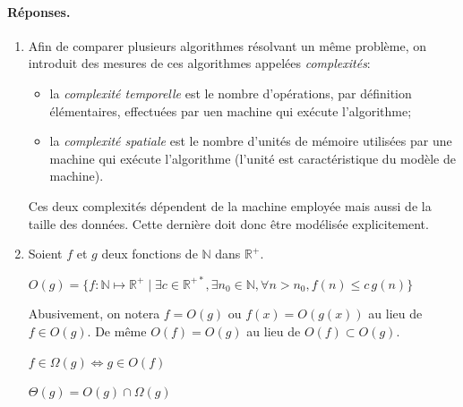 \paragraph{Réponses.}

\begin{enumerate}

  \item Afin de comparer plusieurs algorithmes résolvant un même
    problème, on introduit des mesures de ces algorithmes appelées
    \emph{complexités}:
    \begin{itemize}

       \item la \emph{complexité temporelle} est le nombre
         d'opérations, par définition élémentaires, effectuées par uen
         machine qui exécute l'algorithme;

       \item la \emph{complexité spatiale} est le nombre d'unités de
         mémoire utilisées par une machine qui exécute l'algorithme
         (l'unité est caractéristique du modèle de machine).

    \end{itemize}
    Ces deux complexités dépendent de la machine employée mais aussi
    de la taille des données. Cette dernière doit donc être modélisée
    explicitement.

    \item Soient \(f\) et \(g\) deux fonctions de \(\mathbb{N}\) dans
      \(\mathbb{R}^{+}\).
      \begin{Def}
      \begin{math}
         O(g) = \{f : \mathbb{N} \mapsto \mathbb{R}^{+} \mid
         \exists c \in \mathbb{R}^{+*}, \exists n_0 \in \mathbb{N},
         \forall n > n_0, f (n) \leqslant c \, g(n) \}
      \end{math}
      \end{Def}
      Abusivement, on notera \(f = O(g)\) ou \(f(x) = O (g(x))\) au
      lieu de \(f \in O(g)\). De même \(O(f) = O(g)\) au lieu de
      \(O(f) \subset O(g)\).
      \begin{Def}
        \begin{math}
          f \in \Omega (g) \Leftrightarrow g \in O(f)
        \end{math}
      \end{Def}
      \begin{Def}
        \begin{math}
          \Theta (g) = O(g) \cap \Omega (g)
        \end{math}
      \end{Def}

\end{enumerate}
